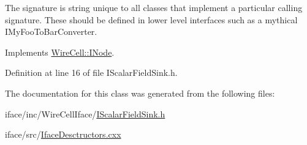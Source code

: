 The signature is string unique to all classes that implement a particular calling signature. These should be defined in lower level interfaces such as a mythical I\+My\+Foo\+To\+Bar\+Converter. 

Implements \hyperlink{class_wire_cell_1_1_i_node_a0b0763465adf5ba7febe8e378162b584}{Wire\+Cell\+::\+I\+Node}.



Definition at line 16 of file I\+Scalar\+Field\+Sink.\+h.



The documentation for this class was generated from the following files\+:\begin{DoxyCompactItemize}
\item 
iface/inc/\+Wire\+Cell\+Iface/\hyperlink{_i_scalar_field_sink_8h}{I\+Scalar\+Field\+Sink.\+h}\item 
iface/src/\hyperlink{_iface_desctructors_8cxx}{Iface\+Desctructors.\+cxx}\end{DoxyCompactItemize}
